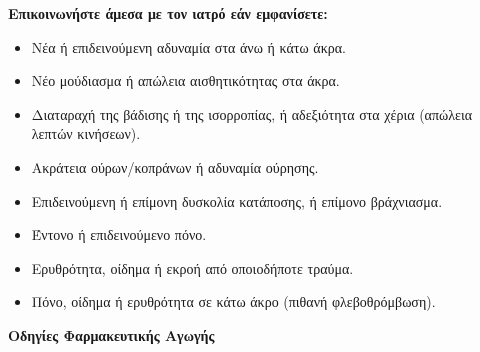 \documentclass[10pt,greek]{article}
\begin{document}
\textbf{Επικοινωνήστε άμεσα με τον ιατρό εάν εμφανίσετε:}
\begin{itemize}
\item Νέα ή επιδεινούμενη αδυναμία στα άνω ή κάτω άκρα.
\item Νέο μούδιασμα ή απώλεια αισθητικότητας στα άκρα.
\item Διαταραχή της βάδισης ή της ισορροπίας, ή αδεξιότητα στα χέρια (απώλεια λεπτών κινήσεων).
\item Ακράτεια ούρων/κοπράνων ή αδυναμία ούρησης.
\item Επιδεινούμενη ή επίμονη δυσκολία κατάποσης, ή επίμονο βράχνιασμα.
\item Έντονο ή επιδεινούμενο πόνο.
\item Ερυθρότητα, οίδημα ή εκροή από οποιοδήποτε τραύμα.
\item Πόνο, οίδημα ή ερυθρότητα σε κάτω άκρο (πιθανή φλεβοθρόμβωση).
\end{itemize}

\newpage
\begin{center}
\LARGE\textbf{Οδηγίες Φαρμακευτικής Αγωγής}
\end{center}
\vspace{0.5cm}
\end{document}
